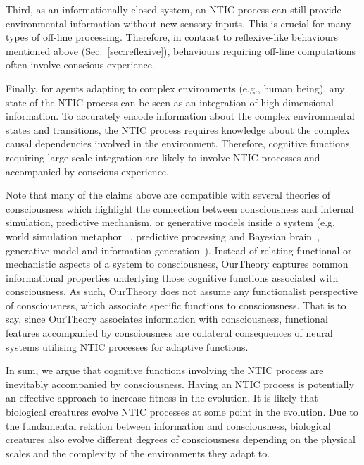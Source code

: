 \documentclass[utf8]{article}
\begin{document}
    	    Third, as an informationally closed system, an NTIC process can still provide environmental information without new sensory inputs. This is crucial for many types of off-line processing. Therefore, in contrast to reflexive-like behaviours mentioned above (Sec.~\ref{sec:reflexive}), behaviours requiring off-line computations \citep{milner1999paradoxical, himmelbach2005dorsal,revol2003pointing} often involve conscious experience. 
    	    
    	    Finally, for agents adapting to complex environments (e.g., human being), any state of the NTIC process can be seen as an integration of high dimensional information. To accurately encode information about the complex environmental states and transitions, the NTIC process requires knowledge about the complex causal dependencies involved in the environment. Therefore, cognitive functions requiring large scale integration are likely to involve NTIC processes and accompanied by conscious experience. %
    	    
    	    Note that many of the claims above are compatible with several theories of consciousness which highlight the connection between consciousness and internal simulation, predictive mechanism, or generative models inside a system (e.g. world simulation metaphor ~\citep{revonsuo2006inner}, predictive processing and Bayesian brain~\citep{clark_2013,Hohwy2013,seth2014predictive}, generative model and information generation~\citep{kanai_chang_yu_de_abril_biehl_guttenberg_2019}). Instead of relating functional or mechanistic aspects of a system to consciousness, \ac{OurTheory} captures common informational properties underlying those cognitive functions associated with consciousness. As such, \ac{OurTheory} does not assume any functionalist perspective of consciousness, which associate specific functions to consciousness.  That is to say, since \ac{OurTheory} associates information  with consciousness, functional features accompanied by consciousness are collateral consequences of neural systems utilising NTIC processes for adaptive functions. 
    	    
    	    In sum, we argue that cognitive functions involving the NTIC process are inevitably accompanied by consciousness. Having an NTIC process is potentially an effective approach to increase fitness in the evolution. It is likely that biological creatures evolve NTIC processes at some point in the evolution. Due to the fundamental relation between information and consciousness, biological creatures also evolve different degrees of consciousness depending on the physical scales and the complexity of the environments they adapt to. 
    	    
\end{document}
